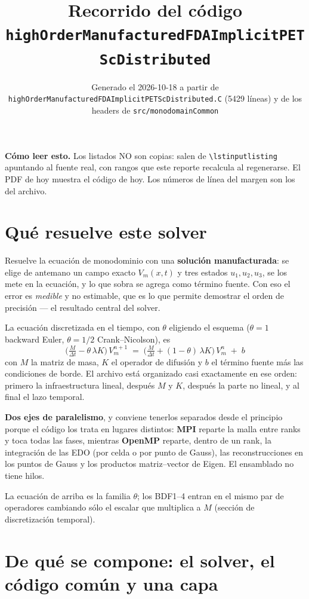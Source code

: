 \documentclass[11pt,a4paper]{article}
\title{\textbf{Recorrido del código}\\[4pt]\large\texttt{highOrderManufacturedFDAImplicitPETScDistributed}}
\author{}
\date{Generado el 2026-10-18 a partir de \texttt{highOrderManufacturedFDAImplicitPETScDistributed.C} (5429 líneas) y de los headers de \texttt{src/monodomainCommon}}
\begin{document}
\maketitle

\noindent\textbf{Cómo leer esto.} Los listados NO son copias: salen de \texttt{\textbackslash lstinputlisting} apuntando al fuente real, con rangos que este reporte recalcula al regenerarse. El PDF de hoy muestra el código de hoy. Los números de línea del margen son los del archivo.

\tableofcontents

\newpage

\section{Qué resuelve este solver}

Resuelve la ecuación de monodominio con una \textbf{solución manufacturada}: se
elige de antemano un campo exacto $V_m(x,t)$ y tres estados $u_1,u_2,u_3$, se los
mete en la ecuación, y lo que sobra se agrega como término fuente. Con eso el
error es \emph{medible} y no estimable, que es lo que permite demostrar el orden
de precisión --- el resultado central del solver.

La ecuación discretizada en el tiempo, con $\theta$ eligiendo el esquema
($\theta=1$ backward Euler, $\theta=1/2$ Crank--Nicolson), es
%
\[ \Big(\tfrac{M}{\Delta t} - \theta\,\lambda K\Big)\,V_m^{n+1}
   \;=\; \Big(\tfrac{M}{\Delta t} + (1-\theta)\,\lambda K\Big)\,V_m^{n}
   \;+\; b \]
%
con $M$ la matriz de masa, $K$ el operador de difusión y $b$ el término fuente
más las condiciones de borde. El archivo está organizado casi exactamente en ese
orden: primero la infraestructura lineal, después $M$ y $K$, después la parte no
lineal, y al final el lazo temporal.

\textbf{Dos ejes de paralelismo}, y conviene tenerlos separados desde el
principio porque el código los trata en lugares distintos: \textbf{MPI} reparte
la malla entre ranks y toca todas las fases, mientras \textbf{OpenMP} reparte,
dentro de un rank, la integración de las EDO (por celda o por punto de Gauss),
las reconstrucciones en los puntos de Gauss y los productos matriz--vector de
Eigen. El ensamblado no tiene hilos.

La ecuación de arriba es la familia $\theta$; los BDF1--4 entran en el mismo
par de operadores cambiando sólo el escalar que multiplica a $M$ (sección de
discretización temporal).

\section{De qué se compone: el solver, el código común y una capa}
\end{document}
